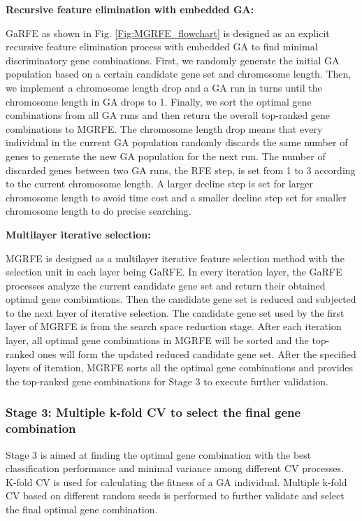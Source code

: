 \documentclass[10pt,journal,compsoc]{IEEEtran}
\begin{document}
	\noindent\textbf{Recursive feature elimination with embedded GA:}
	
	GaRFE as shown in Fig. \ref {Fig:MGRFE_flowchart} is designed as an explicit recursive feature elimination process with embedded GA to find minimal discriminatory gene combinations. First, we randomly generate the initial GA population based on a certain candidate gene set and chromosome length. Then, we implement a chromosome length drop and a GA run in turns until the chromosome length in GA drops to 1. Finally, we sort the optimal gene combinations from all GA runs and then return the overall top-ranked gene combinations to MGRFE. The chromosome length drop means that every individual in the current GA population randomly discards the same number of genes to generate the new GA population for the next run. The number of discarded genes between two GA runs, the RFE step, is set from 1 to 3 according to the current chromosome length. A larger decline step is set for larger chromosome length to avoid time cost and a smaller decline step set for smaller chromosome length to do precise searching.
	
	\noindent\textbf{Multilayer iterative selection:}
	
	MGRFE is designed as a multilayer iterative feature selection method with the selection unit in each layer being GaRFE. In every iteration layer, the GaRFE processes analyze the current candidate gene set and return their obtained optimal gene combinations. Then the candidate gene set is reduced and subjected to the next layer of iterative selection. The candidate gene set used by the first layer of MGRFE is from the search space reduction stage. After each iteration layer, all optimal gene combinations in MGRFE will be sorted and the top-ranked ones will form the updated reduced candidate gene set. After the specified layers of iteration, MGRFE sorts all the optimal gene combinations and provides the top-ranked gene combinations for Stage 3 to execute further validation.
	
	\subsubsection{Stage 3: Multiple k-fold CV to select the final gene combination}
	
	Stage 3 is aimed at finding the optimal gene combination with the best classification performance and minimal variance among different CV processes. K-fold CV is used for calculating the fitness of a GA individual. Multiple k-fold CV based on different random seeds is performed to further validate and select the final optimal gene combination.
	
\end{document}
